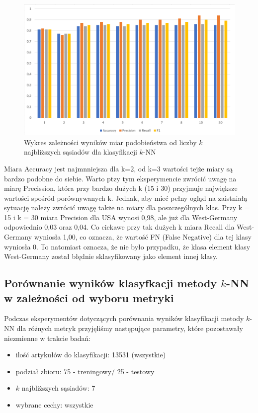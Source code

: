 \documentclass{classrep}
\begin{document}
\begin{figure}[H]
    \centering
    \includegraphics[width=14cm]{wykres_k.png}
    \caption{Wykres zależności wyników miar podobieństwa od liczby $k$ najbliższych sąsiadów dla klasyfikacji $k$-NN}
    \label{wykres:k}
\end{figure}

Miara Accuracy jest najmnniejsza dla k=2, od k=3 wartości tejże miary są bardzo podobne do siebie. Warto ptzy tym eksperymencie zwrócić uwagę na miarę Precission, która przy bardzo dużych k (15 i 30) przyjmuje największe wartości spośród porównywanych k. Jednak, aby mieć pełny ogląd na zaistniałą sytuację należy zwrócić uwagę także na miary dla poszczególnych klas. Przy k = 15 i k = 30 miara Precision dla USA wynosi 0,98, ale już dla West-Germany odpowiednio 0,03 oraz 0,04. Co ciekawe przy tak dużych k miara Recall dla West-Germany wyniosła 1,00, co oznacza, że wartość FN (False Negative) dla tej klasy wyniosła 0. To natomiast oznacza, że nie było przypadku, że klasa element klasy West-Germany został błędnie sklasyfikowany jako element innej klasy.

\subsection{Porównanie wyników klasyfkacji metody $k$-NN w zależności od wyboru metryki}

Podczas eksperymentów dotyczących porównania wyników klasyfikacji metody $k$-NN dla różnych metryk przyjęliśmy następujące parametry, które pozostawały niezmienne w trakcie badań:
\begin{itemize}
    \item ilość artykułów do klasyfikacji: 13531 (wszystkie)
    \item podział zbioru: 75 - treningowy/ 25 - testowy
    \item $k$ najbliższych sąsiadów: 7
    \item wybrane cechy: wszystkie
\end{itemize}
\end{document}
